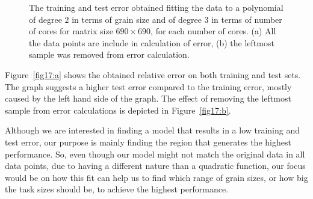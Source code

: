 \vspace{\baselineskip}	
\begin{figure}[H]
	\centering
	\caption{The training and test error obtained fitting the data to a polynomial of degree $2$ in terms of grain size and of degree $3$ in terms of number of cores for matrix size $690\times690$, for each number of cores. (a) All the data points are include in calculation of error, (b) the leftmost sample was removed from error calculation.}	
	\label{fig17}
\end{figure}

Figure~\ref{fig17:a} shows the obtained relative error on both training and test sets. The graph suggests a higher test error compared to the training error, mostly caused by the left hand side of the graph. The effect of removing the leftmost sample from error calculations is depicted in Figure~\ref{fig17:b}.

Although we are interested in finding a model that results in a low training and test error, our purpose is mainly finding the region that generates the highest performance. So, even though our model might not match the original data in all data points, due to having a different nature than a quadratic function, our focus would be on how this fit can help us to find which range of grain sizes, or how big the task sizes should be, to achieve the highest performance. 



